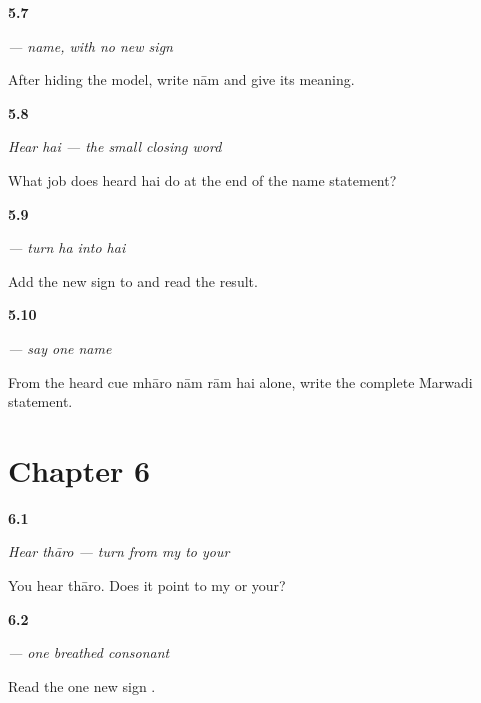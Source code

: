 \noindent\begin{minipage}[t]{\linewidth}
\raggedright
\hypertarget{review-MW-C05-naam-delayed}{\textbf{5.7}} \emph{ — name, with no new sign}\par
\small After hiding the model, write nām and give its meaning.
\end{minipage}\par\medskip

\noindent\begin{minipage}[t]{\linewidth}
\raggedright
\hypertarget{review-MW-C05-hear-hai-meaning}{\textbf{5.8}} \emph{Hear \emph{hai} — the small closing word}\par
\small What job does heard hai do at the end of the name statement?
\end{minipage}\par\medskip

\noindent\begin{minipage}[t]{\linewidth}
\raggedright
\hypertarget{review-MW-W05-ai-matra-read}{\textbf{5.9}} \emph{ — turn \emph{ha} into \emph{hai}}\par
\small Add the new sign to  and read the result.
\end{minipage}\par\medskip

\noindent\begin{minipage}[t]{\linewidth}
\raggedright
\hypertarget{review-MW-C05-answer-dictation}{\textbf{5.10}} \emph{    — say one name}\par
\small From the heard cue mhāro nām rām hai alone, write the complete Marwadi statement.
\end{minipage}\par\medskip

\section*{Chapter 6}

\noindent\begin{minipage}[t]{\linewidth}
\raggedright
\hypertarget{review-MW-C05-hear-tharo-meaning}{\textbf{6.1}} \emph{Hear \emph{thāro} — turn from my to your}\par
\small You hear thāro. Does it point to my or your?
\end{minipage}\par\medskip

\noindent\begin{minipage}[t]{\linewidth}
\raggedright
\hypertarget{review-MW-W05-tha-read}{\textbf{6.2}} \emph{ — one breathed consonant}\par
\small Read the one new sign .
\end{minipage}\par\medskip

